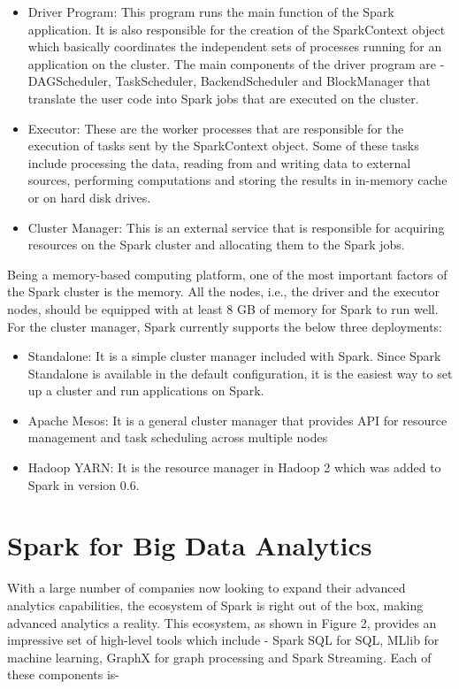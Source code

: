 \documentclass[sigconf]{acmart}
\begin{document}
\begin{itemize}
	\item Driver Program: This program runs the main function of the Spark application. It is also responsible for the creation of the SparkContext object which basically coordinates the independent sets of processes running for an application on the cluster. The main components of the driver program are - DAGScheduler, TaskScheduler, BackendScheduler and BlockManager that translate the user code into Spark jobs that are executed on the cluster.
	\item Executor: These are the worker processes that are responsible for the execution of tasks sent by the SparkContext object. Some of these tasks include processing the data, reading from and writing data to external sources, performing computations and storing the results in in-memory cache or on hard disk drives.
	\item Cluster Manager: This is an external service that is responsible for acquiring resources on the Spark cluster and allocating them to the Spark jobs.
\end{itemize}

Being a memory-based computing platform, one of the most important factors of the Spark cluster is the memory. All the nodes, i.e., the driver and the executor nodes, should be equipped with at least 8 GB of memory for Spark to run well. For the cluster manager, Spark currently supports the below three deployments\cite{fu2016spark-p1}:

\begin{itemize}
	\item Standalone: It is a simple cluster manager included with Spark. Since Spark Standalone is available in the default configuration, it is the easiest way to set up a cluster and run applications on Spark.
	\item Apache Mesos: It is a general cluster manager that provides API for resource management and task scheduling across multiple nodes
	\item Hadoop YARN: It is the resource manager in Hadoop 2 which was added to Spark in version 0.6.
\end{itemize}

\section{Spark for Big Data Analytics}
With a large number of companies now looking to expand their advanced analytics capabilities, the ecosystem of Spark is right out of the box, making advanced analytics a reality. This ecosystem, as shown in Figure 2, provides an impressive set of high-level tools which include - Spark SQL for SQL, MLlib for machine learning, GraphX for graph processing and Spark Streaming\cite{fu2016spark-p1}. Each of these components is-
\end{document}
